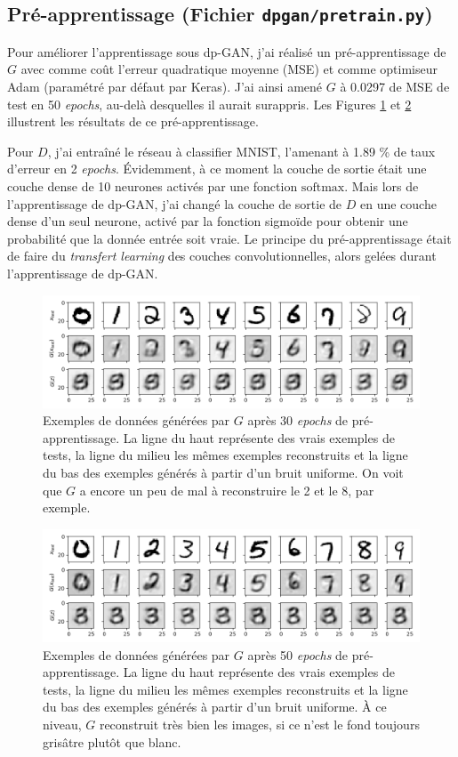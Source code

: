 \documentclass[a4paper,11pt,twoside]{article}
\theoremstyle{definition}
\begin{document}
\subsection{Pré-apprentissage {\normalfont(Fichier \texttt{dpgan/pretrain.py})}} Pour améliorer l'apprentissage sous dp-GAN, j'ai réalisé un pré-apprentissage de $G$ avec comme coût l'erreur quadratique moyenne (MSE) et comme optimiseur Adam (paramétré par défaut par Keras). J'ai ainsi amené $G$ à 0.0297 de MSE de test en 50 \textit{epochs}, au-delà desquelles il aurait surappris. Les Figures \ref{fig:pretrain_g_30} et \ref{fig:pretrain_g_50} illustrent les résultats de ce pré-apprentissage.

Pour $D$, j'ai entraîné le réseau à classifier MNIST, l'amenant à 1.89 \% de taux d'erreur en 2 \textit{epochs}. Évidemment, à ce moment la couche de sortie était une couche dense de 10 neurones activés par une fonction $\mathrm{softmax}$. Mais lors de l'apprentissage de dp-GAN, j'ai changé la couche de sortie de $D$ en une couche dense d'un seul neurone, activé par la fonction sigmoïde pour obtenir une probabilité que la donnée entrée soit vraie. Le principe du pré-apprentissage était de faire du \textit{transfert learning} des couches convolutionnelles, alors gelées durant l'apprentissage de dp-GAN.

\begin{figure}
\includegraphics[width=\linewidth]{pretraining_G_30epochs.png}
\caption{Exemples de données générées par $G$ après 30 \textit{epochs} de pré-apprentissage. La ligne du haut représente des vrais exemples de tests, la ligne du milieu les mêmes exemples reconstruits et la ligne du bas des exemples générés à partir d'un bruit uniforme. On voit que $G$ a encore un peu de mal à reconstruire le 2 et le 8, par exemple.}
\label{fig:pretrain_g_30}
\end{figure}

\begin{figure}
\includegraphics[width=\linewidth]{pretraining_G_50epochs.png}
\caption{Exemples de données générées par $G$ après 50 \textit{epochs} de pré-apprentissage. La ligne du haut représente des vrais exemples de tests, la ligne du milieu les mêmes exemples reconstruits et la ligne du bas des exemples générés à partir d'un bruit uniforme. À ce niveau, $G$ reconstruit très bien les images, si ce n'est le fond toujours grisâtre plutôt que blanc.}
\label{fig:pretrain_g_50}
\end{figure}
\end{document}
